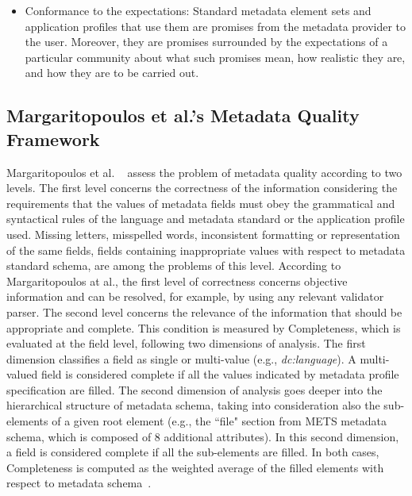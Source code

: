 \documentclass[epsfig,a4paper,12pt,titlepage]{book}
\begin{document}
\begin{itemize}
\item Conformance to the expectations: Standard metadata element sets and application profiles that use them are promises from the metadata provider to the user. Moreover, they are promises surrounded by the expectations of a particular community about what such promises mean, how realistic they are, and how they are to be carried out.
\end{itemize} 

\subsection{Margaritopoulos et al.'s Metadata Quality Framework}
\label{sub:marga}
Margaritopoulos et al. ~\cite{margaritopoulos2009fine} assess the problem of metadata quality according to two levels. The first level concerns the correctness of the information considering the requirements that the values of metadata fields must obey the grammatical and syntactical rules of the  language and metadata standard or the application profile used. Missing letters, misspelled words, inconsistent formatting or  representation of the same fields, fields containing inappropriate values with respect to metadata standard schema, are among the problems of this  level. According to Margaritopoulos at al., the first level of correctness concerns objective information and can be resolved, for  example, by using any relevant validator parser. The second level concerns the relevance of the information that should be appropriate and complete. This condition is  measured by Completeness, which is evaluated at the field level, following two dimensions of analysis. The first dimension classifies a field as single or multi-value (e.g., \textit{dc:language}). A multi-valued field is considered complete if all the values indicated by metadata profile specification are filled. The second dimension of analysis goes deeper into the hierarchical structure of metadata schema, taking into consideration also the sub-elements of a given root element  (e.g., the 
``file" section from METS metadata schema, which is composed of 8 additional attributes). In this second dimension, a field is considered complete if all the sub-elements are filled. In both cases, Completeness is computed as the weighted average of the filled elements with respect to metadata schema~\cite{margaritopoulos2009fine,margaritopoulos2012quantifying}.
\end{document}
